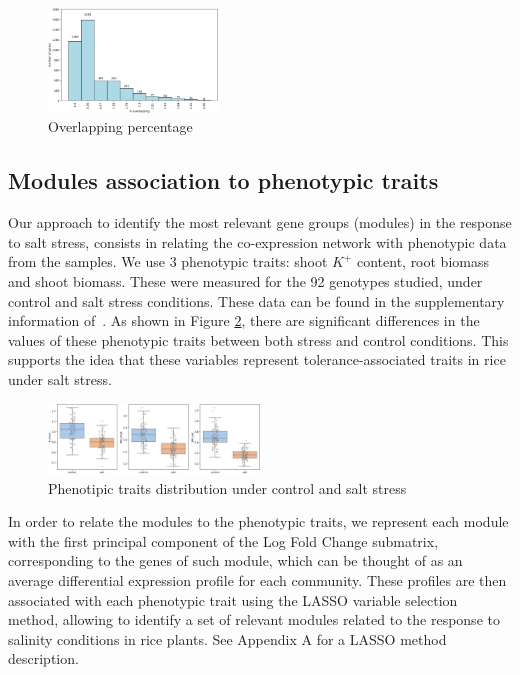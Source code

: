 \documentclass[conference]{IEEEtran}
\begin{document}
\begin{figure}[h]
  \centering
    \includegraphics[clip,width=0.4\textwidth]{Figures/artificial_modules.png}
  \caption{Overlapping percentage}
  \label{fig:overlap}
\end{figure}

\subsection{Modules association to phenotypic traits}

Our approach to identify the most relevant gene groups (modules) in the response to salt stress, consists in relating the co-expression network with phenotypic data from the samples. We use 3 phenotypic traits: shoot $K^+$ content, root biomass and shoot biomass. These were measured for the 92 genotypes studied, under  control and salt stress conditions. These data can be found in the supplementary information of~\cite{campbell2017allelic}. As shown in Figure \ref{fig:pdata}, there are significant differences in the values of these phenotypic traits between both stress and control conditions. This supports the idea that these variables represent tolerance-associated traits in rice under salt stress.\\

\begin{figure}[h]
  \centering
    \includegraphics[clip,width=0.5\textwidth]{Figures/phenotypic_traits.png}
  \caption{Phenotipic traits distribution under control and salt stress}
  \label{fig:pdata}
\end{figure}

In order to relate the modules to the phenotypic traits, we represent each module with the first principal component of the Log Fold Change submatrix, corresponding to the genes of such module, which can be thought of as an average differential expression profile for each community. These profiles are then associated with each phenotypic trait using the LASSO variable selection method, allowing to identify a set of relevant modules related to the response to salinity conditions in rice plants. See Appendix A for a LASSO method description.\\
\end{document}
